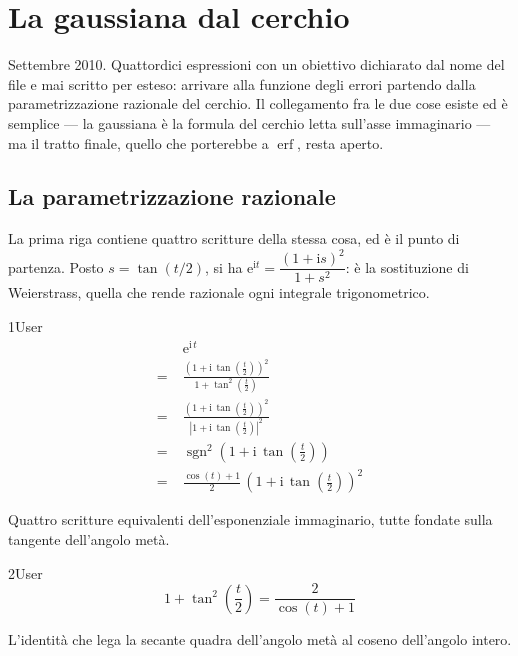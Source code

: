 \chapter{La gaussiana dal cerchio}
\label{cap:gauss}

Settembre 2010. Quattordici espressioni con un obiettivo dichiarato dal nome del file e mai scritto per esteso: arrivare alla funzione degli errori partendo dalla parametrizzazione razionale del cerchio. Il collegamento fra le due cose esiste ed è semplice — la gaussiana è la formula del cerchio letta sull'asse immaginario — ma il tratto finale, quello che porterebbe a $\operatorname{erf}$, resta aperto.

\section{La parametrizzazione razionale}

La prima riga contiene quattro scritture della stessa cosa, ed è il punto di partenza. Posto $s=\tan(t/2)$, si ha $\mathrm{e}^{\mathrm{i}t}=\dfrac{(1+\mathrm{i}s)^2}{1+s^2}$: è la sostituzione di Weierstrass, quella che rende razionale ogni integrale trigonometrico.

\begin{espr}{1}{User}{}
\begin{align*}
& \mathrm{e}^{\mathrm{i}\, t} \\
=\;& \frac{\left(1 + \mathrm{i}\, \tan\!\left(\frac{t}{2}\right)\right)^{2}}{1 + \tan^{2}\!\left(\frac{t}{2}\right)} \\
=\;& \frac{\left(1 + \mathrm{i}\, \tan\!\left(\frac{t}{2}\right)\right)^{2}}{\left|1 + \mathrm{i}\, \tan\!\left(\frac{t}{2}\right)\right|^{2}} \\
=\;& \operatorname{sgn}^{2}\!\left(1 + \mathrm{i}\, \tan\!\left(\frac{t}{2}\right)\right) \\
=\;& \frac{\cos\!\left(t\right) + 1}{2}\, \left(1 + \mathrm{i}\, \tan\!\left(\frac{t}{2}\right)\right)^{2}
\end{align*}
\end{espr}
Quattro scritture equivalenti dell'esponenziale immaginario, tutte fondate sulla tangente dell'angolo metà.

\begin{espr}{2}{User}{\verificata}
\[
1 + \tan^{2}\!\left(\frac{t}{2}\right) = \frac{2}{\cos\!\left(t\right) + 1}
\]
\end{espr}
L'identità che lega la secante quadra dell'angolo metà al coseno dell'angolo intero.

